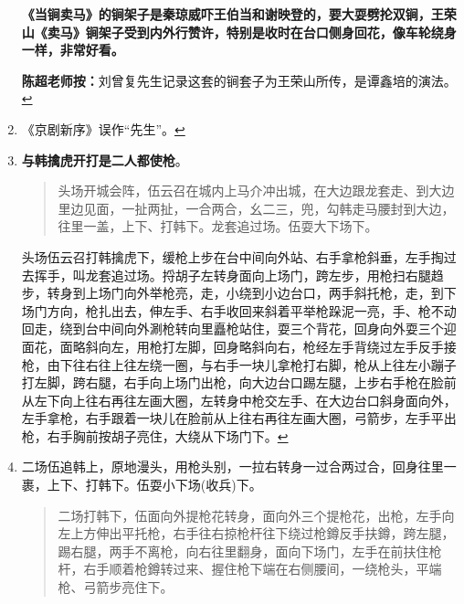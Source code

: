 \begin{enumerate}
  \textbf{《当锏卖马》的锏架子是秦琼威吓王伯当和谢映登的，要大耍劈抡双锏，王荣山《卖马》锏架子受到内外行赞许，特别是收时在台口侧身回花，像车轮绕身一样，非常好看。}

  \textbf{陈超老师按：}刘曾复先生记录这套的锏套子为王荣山所传，是谭鑫培的演法。\protect\hyperlink{fnref314}{↩}
\item
  \leavevmode\hypertarget{fn315}{}%
  《京剧新序》误作``先生''。\protect\hyperlink{fnref315}{↩}
\item
  \leavevmode\hypertarget{fn316}{}%
  \textbf{与韩擒虎开打是二人都使枪}。

  \begin{quote}
  头场开城会阵，伍云召在城内上马介冲出城，在大边跟龙套走、到大边里边见面，一扯两扯，一合两合，幺二三，兜，勾韩走马腰封到大边，往里一盖，上下、打韩下。龙套追过场。伍耍大下场下。
  \end{quote}

  头场伍云召打韩擒虎下，缓枪上步在台中间向外站、右手拿枪斜垂，左手掏过去挥手，叫龙套追过场。捋胡子左转身面向上场门，跨左步，用枪扫右腿趋步，转身到上场门向外举枪亮，走，小绕到小边台口，两手斜托枪，走，到下场门方向，枪扎出去，伸左手、右手收回来斜着平举枪跺泥一亮，手、枪不动回走，绕到台中间向外涮枪转向里矗枪站住，耍三个背花，回身向外耍三个迎面花，面略斜向左，用枪打左脚，回身略斜向右，枪经左手背绕过左手反手接枪，由下往右往上往左绕一圈，与右手一块儿拿枪打右脚，枪从上往左小蹦子打左脚，跨右腿，右手向上场门出枪，向大边台口踢左腿，上步右手枪在脸前从左下向上往右再往左画大圈，左转身中枪交左手、在大边台口斜身面向外，左手拿枪，右手跟着一块儿在脸前从上往右再往左画大圈，弓箭步，左手平出枪，右手胸前按胡子亮住，大绕从下场门下。\protect\hyperlink{fnref316}{↩}
\item
  \leavevmode\hypertarget{fn317}{}%
  二场伍追韩上，原地漫头，用枪头别，一拉右转身一过合两过合，回身往里一裹，上下、打韩下。伍耍小下场(收兵)下。

  \begin{quote}
  二场打韩下，伍面向外提枪花转身，面向外三个提枪花，出枪，左手向左上方伸出平托枪，右手往右掠枪杆往下绕过枪鐏反手扶鐏，跨左腿，踢右腿，两手不离枪，向右往里翻身，面向下场门，左手在前扶住枪杆，右手顺着枪鐏转过来、握住枪下端在右侧腰间，一绕枪头，平端枪、弓箭步亮住下。
  \end{quote}


\end{enumerate}
